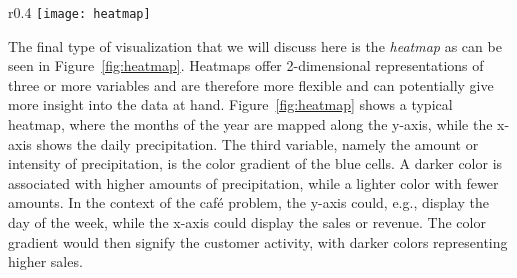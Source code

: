 \begin{wrapfigure}{r}{0.4\textwidth}
    \centering
    \texttt{[image: heatmap]}
    \caption{A heatmap~\cite{atlassianHeatmaps}.
    }\label{fig:heatmap}
\end{wrapfigure}

The final type of visualization that we will discuss here is the \textit{heatmap} as can be seen in
Figure~\ref{fig:heatmap}.
Heatmaps offer 2-dimensional representations of three or more variables and are therefore more flexible and can
potentially give more insight into the data at hand.
Figure~\ref{fig:heatmap} shows a typical heatmap, where the months of the year are mapped along the y-axis, while the
x-axis shows the daily precipitation.
The third variable, namely the amount or intensity of precipitation, is the color gradient of the blue cells.
A darker color is associated with higher amounts of precipitation, while a lighter color with fewer amounts.
In the context of the café problem, the y-axis could, e.g., display the day of the week, while the x-axis could display
the sales or revenue.
The color gradient would then signify the customer activity, with darker colors representing higher sales.
